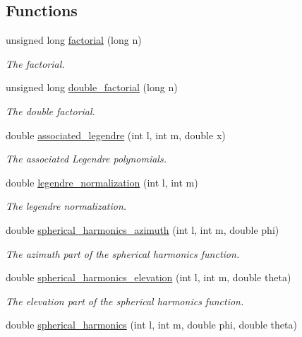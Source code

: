 \subsection*{Functions}
\begin{DoxyCompactItemize}
\item 
unsigned long \hyperlink{namespace_hoa2_d_aa2509e69c16eaccb5bf52b794f82e5d5}{factorial} (long n)
\begin{DoxyCompactList}\small\item\em The factorial. \end{DoxyCompactList}\item 
unsigned long \hyperlink{namespace_hoa2_d_a79139b3e9b66775f4d86ebceb9c93690}{double\-\_\-factorial} (long n)
\begin{DoxyCompactList}\small\item\em The double factorial. \end{DoxyCompactList}\item 
double \hyperlink{namespace_hoa2_d_a0fd23499292e1a3fee0028cd794f00b8}{associated\-\_\-legendre} (int l, int m, double x)
\begin{DoxyCompactList}\small\item\em The associated Legendre polynomials. \end{DoxyCompactList}\item 
double \hyperlink{namespace_hoa2_d_aaf2d3dffd22378fbbed35ceb064d6cd8}{legendre\-\_\-normalization} (int l, int m)
\begin{DoxyCompactList}\small\item\em The legendre normalization. \end{DoxyCompactList}\item 
double \hyperlink{namespace_hoa2_d_aa4300b4c392fb64e38d38d26b50b0f97}{spherical\-\_\-harmonics\-\_\-azimuth} (int l, int m, double phi)
\begin{DoxyCompactList}\small\item\em The azimuth part of the spherical harmonics function. \end{DoxyCompactList}\item 
double \hyperlink{namespace_hoa2_d_af34e9145e2b00a751ca3947b454ac9bd}{spherical\-\_\-harmonics\-\_\-elevation} (int l, int m, double theta)
\begin{DoxyCompactList}\small\item\em The elevation part of the spherical harmonics function. \end{DoxyCompactList}\item 
double \hyperlink{namespace_hoa2_d_a3309f026045a0e44287470c0d2680321}{spherical\-\_\-harmonics} (int l, int m, double phi, double theta)

\end{DoxyCompactItemize}
